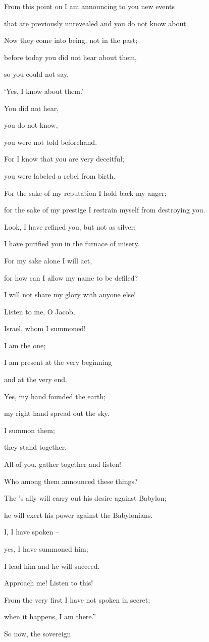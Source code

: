 {\par }{\Q From this point on I am announcing to you new
events
\par }{\Q that are previously unrevealed
and you do not
know about.
\par }{\Q {}Now
they come into being,
not
in the past;
\par }{\Q before
today
you did not
hear
about them,
\par }{\Q so you could
not say,
\par }{\Q ‘Yes,
I know about them.’
\par }{\Q {}You did not
hear,
\par }{\Q you do not
know,
\par }{\Q you were not
told
beforehand.
\par }{\Q For
I know
that you are very deceitful;
\par }{\Q you were labeled
a rebel
from birth.
\par }{\Q {}For the sake
of my reputation
I hold back
my anger;
\par }{\Q for the sake of my prestige
I restrain
myself from destroying you.
\par }{\Q {}Look,
I have refined
you, but not
as silver;
\par }{\Q I have purified
you in the furnace
of misery.
\par }{\Q {}For
my sake
alone I will act,
\par }{\Q for
how
can I allow my name to be defiled?

\par }{\Q I will not
share
my glory
with anyone else!
\par }{\Q {}Listen
to me,
O Jacob,
\par }{\Q Israel,
whom I summoned!
\par }{\Q I am
the one;
\par }{\Q I
am
present at the very beginning
\par }{\Q and at the very end.
\par }{\Q {}Yes,
my hand
founded
the earth;
\par }{\Q my right hand
spread
out the sky.
\par }{\Q I
summon
them;
\par }{\Q they stand
together.
\par }{\Q {}All
of you, gather
together and listen!
\par }{\Q Who
among them announced
these
things?
\par }{\Q The
{}’s
ally
will carry
out his desire
against Babylon;
\par }{\Q he will exert
his power against the Babylonians.
\par }{\Q {}I,
I
have spoken
–
\par }{\Q yes,
I have summoned
him;
\par }{\Q I lead
him and he will succeed.
\par }{\Q {}Approach
me! Listen
to this!
\par }{\Q From the very first
I have not
spoken
in secret;
\par }{\Q when
it happens, I am
there.”
\par }{\Q So now,
the sovereign

}
